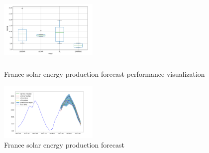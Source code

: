 \documentclass[acmtog]{acmart}
\begin{document}
\begin{figure}[htp!]
    \centering
    \includegraphics[width=0.42\textwidth, height=4cm]{figures/Figure_3.png}
    \caption{France solar energy production forecast performance visualization}
    \label{fig:solar_performance_forecast} %
\end{figure}
\begin{figure}[htp!]
    \centering
    \includegraphics[width=0.42\textwidth]{figures/Figure_1.png}
    \caption{France solar energy production forecast}
    \label{fig:solar_forecast} %
\end{figure}
\end{document}

